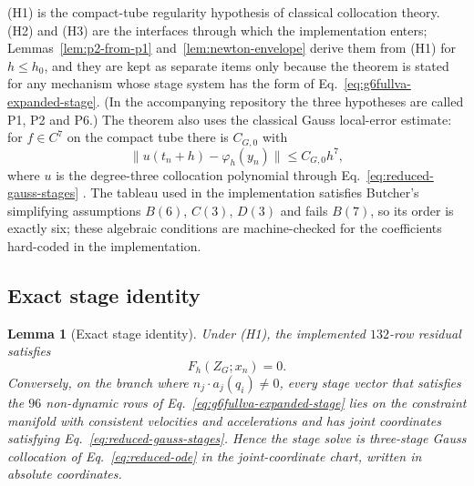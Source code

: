 \documentclass[preprint,12pt]{elsarticle}
\newtheorem{lemma}{Lemma}
\begin{document}
(H1) is the compact-tube regularity hypothesis of classical collocation theory. (H2) and (H3) are
the interfaces through which the implementation enters; Lemmas~\ref{lem:p2-from-p1}
and~\ref{lem:newton-envelope} derive them from (H1) for $h\le h_0$, and they are kept as separate
items only because the theorem is stated for any mechanism whose stage system has the form of
Eq.~\eqref{eq:g6fullva-expanded-stage}. (In the accompanying repository the three hypotheses are
called P1, P2 and P6.) The theorem also uses the classical Gauss local-error estimate: for
$f\in C^7$ on the compact tube there is $C_{G,0}$ with
\begin{equation}
  \|u(t_n+h)-\varphi_h(y_n)\|\le C_{G,0}h^7,
  \label{eq:gauss-local-truncation}
\end{equation}
where $u$ is the degree-three collocation polynomial through Eq.~\eqref{eq:reduced-gauss-stages}
\cite{hairer1993solving}. The tableau used in the implementation satisfies Butcher's simplifying
assumptions $B(6)$, $C(3)$, $D(3)$ and fails $B(7)$, so its order is exactly six; these algebraic
conditions are machine-checked for the coefficients hard-coded in the implementation.

\subsection{Exact stage identity}

\begin{lemma}[Exact stage identity]
\label{lem:exact-stage-identity}
Under (H1), the implemented $132$-row residual satisfies
\begin{equation}
  F_h(Z_G;x_n)=0 .
  \label{eq:exact-stage-identity}
\end{equation}
Conversely, on the branch where $n_j\cdot a_j(q_i)\neq0$, every stage vector that satisfies the
$96$ non-dynamic rows of Eq.~\eqref{eq:g6fullva-expanded-stage} lies on the constraint manifold
with consistent velocities and accelerations and has joint coordinates satisfying
Eq.~\eqref{eq:reduced-gauss-stages}. Hence the stage solve is three-stage Gauss collocation of
Eq.~\eqref{eq:reduced-ode} in the joint-coordinate chart, written in absolute coordinates.
\end{lemma}
\end{document}
